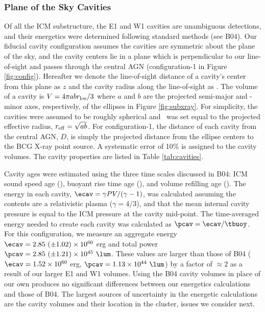 \documentclass[11pt, preprint]{aastex}
\begin{document}
\subsubsection{Plane of the Sky Cavities}
\label{sec:ecav}

Of all the ICM substructure, the E1 and W1 cavities are unambiguous
detections, and their energetics were determined following standard
methods (see B04). Our fiducial cavity configuration assumes the
cavities are symmetric about the plane of the sky, and the cavity
centers lie in a plane which is perpendicular to our line-of-sight and
passes through the central AGN (configuration-1 in Figure
\ref{fig:config}). Hereafter we denote the line-of-sight distance of a
cavity's center from this plane as $z$ and the cavity radius along the
line-of-sight as \rlos. The volume of a cavity is $V = 4\pi a b
r_{\rm{los}}/3$ where $a$ and $b$ are the projected semi-major and -minor
axes, respectively, of the ellipses in Figure \ref{fig:subxray}. For
simplicity, the cavities were assumed to be roughly spherical and
\rlos\ was set equal to the projected effective radius, $r_{\rm{eff}} =
\sqrt{ab}$. For configuration-1, the distance of each cavity from the
central AGN, $D$, is simply the projected distance from the ellipse
centers to the BCG X-ray point source. A systematic error of 10\% is
assigned to the cavity volumes. The cavity properties are listed in
Table \ref{tab:cavities}.

Cavity ages were estimated using the three time scales discussed in
B04: ICM sound speed age (\tsonic), buoyant rise time age (\tbuoy),
and volume refilling age (\trefill). The energy in each cavity, $\ecav
= \gamma PV/(\gamma-1)$, was calculated assuming the contents are a
relativistic plasma ($\gamma = 4/3$), and that the mean internal
cavity pressure is equal to the ICM pressure at the cavity
mid-point. The time-averaged energy needed to create each cavity was
calculated as $\pcav = \ecav/\tbuoy$. For this configuration, we
measure an aggregate energy $\ecav = 2.85 ~(\pm 1.02) \times 10^{60}$
erg and total power $\pcav = 2.85 ~(\pm 1.21) \times 10^{45}
~\lum$. These values are larger than those of B04 ($\ecav = 1.52
\times 10^{60}$ erg, $\pcav = 1.13 \times 10^{44} ~\lum$) by a factor
of $\approx 2$ as a result of our larger E1 and W1 volumes. Using the
B04 cavity volumes in place of our own produces no significant
differences between our energetics calculations and those of B04. The
largest sources of uncertainty in the energetic calculations are the
cavity volumes and their location in the cluster, issues we consider
next.
\end{document}
